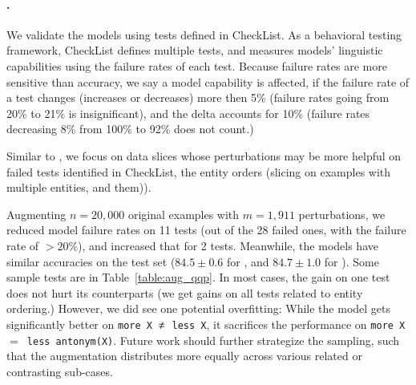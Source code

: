 \paragraph{\qqp.}
We validate the models using tests defined in CheckList.
As a behavioral testing framework, CheckList defines multiple tests, and measures models' linguistic capabilities using the failure rates of each test.
Because failure rates are more sensitive than accuracy, we say a model capability is affected, if the failure rate of a test changes (increases or decreases) more then 5\% (\eg failure rates going from 20\% to 21\% is insignificant), and the delta accounts for 10\% (\eg failure rates decreasing 8\% from 100\% to 92\% does not count.)

Similar to \nli, we focus on data slices whose perturbations may be more helpful on failed tests identified in CheckList, \eg the entity orders (slicing on examples with multiple entities, and  them)).

Augmenting $n=20,000$ original examples with $m=1,911$ perturbations, we reduced model failure rates on 11 tests (out of the 28 failed ones, with the failure rate of \mcomp $>20\%$), and increased that for 2 tests.
Meanwhile, the models have similar accuracies on the test set ($84.5 \pm 0.6$ for \maug, and $84.7 \pm 1.0$ for \mcomp).
Some sample tests are in Table~\ref{table:aug_qqp}.
In most cases, the gain on one test does not hurt its counterparts (\eg we get gains on all tests related to entity ordering.)
However, we did see one potential overfitting: While the model gets significantly better on  \texttt{more X $\not\eq$ less X}, it sacrifices the performance on \texttt{more X $=$ less antonym(X)}.
Future work should further strategize the sampling, such that the augmentation distributes more equally across various related or contrasting sub-cases. 

